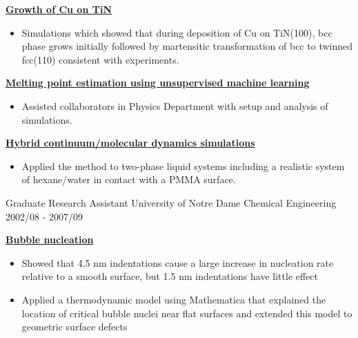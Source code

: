 \begin{cventries}
{\begin{cvitems}
\begin{itemize}
                \end{itemize}
            \item {\textbf{\underline{Growth of Cu on TiN}}}
                \vspace{2pt}
                \begin{itemize}
                \item {Simulations which showed that during deposition of Cu on TiN(100), bcc phase grows initially followed by martensitic transformation of bcc to twinned fcc(110) consistent with experiments.}
                \end{itemize}
            \item {\textbf{\underline{Melting point estimation using unsupervised machine learning}}}
                \vspace{2pt}
                \begin{itemize}
                \item {Assisted collaborators in Physics Department with setup and analysis of simulations.}
                \end{itemize}
            \item {\textbf{\underline{Hybrid continuum/molecular dynamics simulations}}}
                \vspace{2pt}
                \begin{itemize}
                \item {Applied the method to two-phase liquid systems including a realistic system of hexane/water in contact with a PMMA surface.}
                \end{itemize}
        \end{cvitems}
    }

  \cventry
    {Graduate Research Assistant} %
    {University of Notre Dame} %
    {Chemical Engineering} %
    {2002/08 - 2007/09} %
    {
      \begin{cvitems} %
        \item {\textbf{\underline{Bubble nucleation}}}
            \begin{itemize}
                \item {Showed that 4.5 nm indentations cause a large increase in nucleation rate relative to a smooth surface, but 1.5 nm indentations have little effect}
                \item {Applied a thermodynamic model using Mathematica that explained the location of critical bubble nuclei near flat surfaces and extended this model to geometric surface defects}
            \end{itemize}
      \end{cvitems}
    }
    

\end{cventries}
